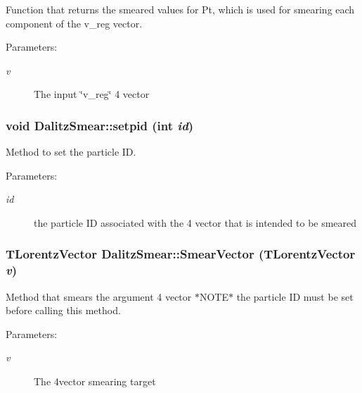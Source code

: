 Function that returns the smeared values for Pt, which is used for smearing each component of the v\_\-reg vector. 

\begin{Desc}
\item[Parameters:]
\begin{description}
\item[{\em v}]The input \char`\"{}v\_\-reg\char`\"{} 4 vector \end{description}
\end{Desc}
\subsubsection{\setlength{\rightskip}{0pt plus 5cm}void Dalitz\-Smear::setpid (int {\em id})}\label{classDalitzSmear_63e8f796d9c84111327341c3eefec43a}


Method to set the particle ID. 

\begin{Desc}
\item[Parameters:]
\begin{description}
\item[{\em id}]the particle ID associated with the 4 vector that is intended to be smeared \end{description}
\end{Desc}
\subsubsection{\setlength{\rightskip}{0pt plus 5cm}TLorentz\-Vector Dalitz\-Smear::Smear\-Vector (TLorentz\-Vector {\em v})}\label{classDalitzSmear_ae475bf2bea39d1ff580ad0e3ddaa71a}


Method that smears the argument 4 vector $\ast$NOTE$\ast$ the particle ID must be set before calling this method. 

\begin{Desc}
\item[Parameters:]
\begin{description}
\item[{\em v}]The 4vector smearing target \end{description}
\end{Desc}

